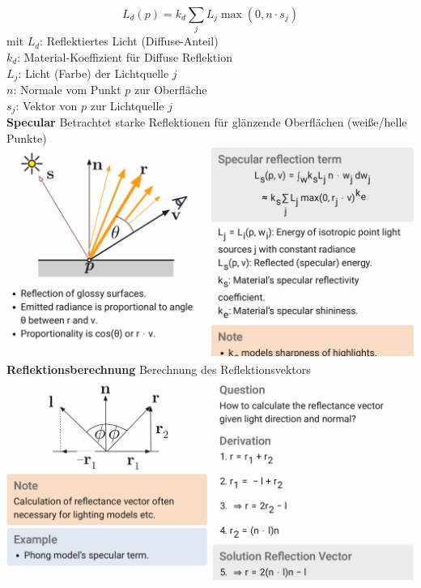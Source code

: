 \documentclass[12pt]{article}
\begin{document}
	$$L_d(p) = k_d \sum_j L_j \max(0, n \cdot s_j)$$
	mit $L_d$: Reflektiertes Licht (Diffuse-Anteil)\\
	$k_d$: Material-Koeffizient für Diffuse Reflektion\\
	$L_j$: Licht (Farbe) der Lichtquelle $j$\\
	$n$: Normale vom Punkt $p$ zur Oberfläche\\
	$s_j$: Vektor von $p$ zur Lichtquelle $j$\\
	\textbf{Specular} Betrachtet starke Reflektionen für glänzende Oberflächen (weiße/helle Punkte)\\
	\includegraphics[width=\linewidth]{figures/phong-specular.png}\\
	\textbf{Reflektionsberechnung} Berechnung des Reflektionsvektors\\
	\includegraphics[width=\linewidth]{figures/reflektionsvektor.png}
\end{document}
